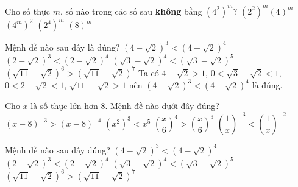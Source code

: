 \begin{ex}%
	Cho số thực $m$, số nào trong các số sau \textbf{không} bằng $\left(4^2\right)^m$?
	\choice
	{$\left(2^2\right)^{m}\left(4\right)^m$}
	{$\left(4^m\right)^2$}
	{$\left(2^4\right)^m$}
	{\True $\left(8\right)^m$}
\end{ex}
\begin{ex}%
	Mệnh đề nào sau đây là đúng?
	\choice
	{\True $(4-\sqrt{2})^3<(4-\sqrt{2})^4$}
	{$(2-\sqrt{2})^3<(2-\sqrt{2})^4$}
	{$(\sqrt{3}-\sqrt{2})^4<(\sqrt{3}-\sqrt{2})^5$}
	{$(\sqrt{11}-\sqrt{2})^6>(\sqrt{11}-\sqrt{2})^7$}
	\loigiai
	{Ta có $4-\sqrt{2}>1$, $0<\sqrt{3}-\sqrt{2}<1$, $0<2-\sqrt{2}<1$, $\sqrt{11}-\sqrt{2}>1$ nên $(4-\sqrt{2})^3<(4-\sqrt{2})^4$ là đúng.}
\end{ex}
\begin{ex}%
	Cho $x$ là số thực lớn hơn $8$. Mệnh đề nào dưới đây đúng?
	\choice
	{$(x-8)^{-3}>(x-8)^{-4}$}
	{$(x^2)^3<x^5$}
	{\True $\left(\dfrac{x}{6}\right)^4>\left(\dfrac{x}{6}\right)^3$}
	{$\left(\dfrac{1}{x}\right)^{-3}<\left(\dfrac{1}{x}\right)^{-2}$}
\end{ex}
\begin{ex}%
	Mệnh đề nào sau đây đúng?
	\choice
	{\True $\left(4-\sqrt{2}\right)^3<\left(4-\sqrt{2}\right)^4$}
	{$\left(2-\sqrt{2}\right)^3<\left(2-\sqrt{2}\right)^4$}
	{$\left(\sqrt{3}-\sqrt{2}\right)^4<\left(\sqrt{3}-\sqrt{2}\right)^5$}
	{$\left(\sqrt{11}-\sqrt{2}\right)^6>\left(\sqrt{11}-\sqrt{2}\right)^7$}
\end{ex}
